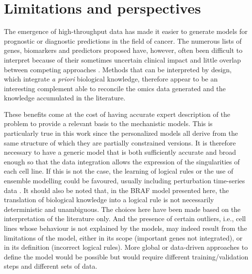 \documentclass[a4paper,12pt,twoside,onecolumn,openright,final,oldfontcommands]{memoir}
\begin{document}
\section{Limitations and
perspectives}\label{limitations-and-perspectives}

The emergence of high-throughput data has made it easier to generate
models for prognostic or diagnostic predictions in the field of cancer.
The numerous lists of genes, biomarkers and predictors proposed have,
however, often been difficult to interpret because of their sometimes
uncertain clinical impact and little overlap between competing
approaches \citep{domany2014using}. Methods that can be interpreted by
design, which integrate \emph{a priori} biological knowledge, therefore
appear to be an interesting complement able to reconcile the omics data
generated and the knowledge accumulated in the literature.

These benefits come at the cost of having accurate expert description of
the problem to provide a relevant basis to the mechanistic models. This
is particularly true in this work since the personalized models all
derive from the same structure of which they are partially constrained
versions. It is therefore necessary to have a generic model that is both
sufficiently accurate and broad enough so that the data integration
allows the expression of the singularities of each cell line. If this is
not the case, the learning of logical rules or the use of ensemble
modelling could be favoured, usually including perturbation time-series
data \citep{razzaq2018computational}. It should also be noted that, in
the BRAF model presented here, the translation of biological knowledge
into a logical rule is not necessarily deterministic and unambiguous.
The choices here have been made based on the interpretation of the
literature only. And the presence of certain outliers, i.e., cell lines
whose behaviour is not explained by the models, may indeed result from
the limitations of the model, either in its scope (important genes not
integrated), or in its definition (incorrect logical rules). More global
or data-driven approaches to define the model would be possible but
would require different training/validation steps and different sets of
data.
\end{document}
